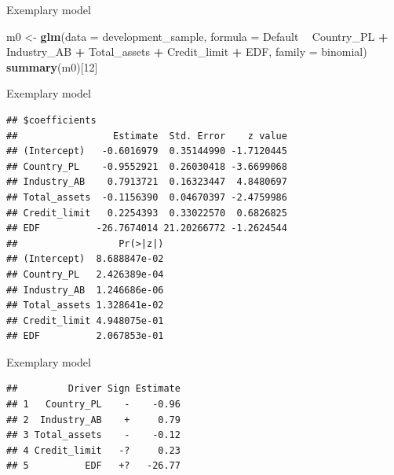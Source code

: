 \documentclass[9pt,ignorenonframetext,]{beamer}
\newenvironment{Shaded}{\begin{snugshade}}{\end{snugshade}}
\newcommand{\KeywordTok}[1]{\textcolor[rgb]{0.13,0.29,0.53}{\textbf{#1}}}
\newcommand{\DataTypeTok}[1]{\textcolor[rgb]{0.13,0.29,0.53}{#1}}
\newcommand{\DecValTok}[1]{\textcolor[rgb]{0.00,0.00,0.81}{#1}}
\newcommand{\StringTok}[1]{\textcolor[rgb]{0.31,0.60,0.02}{#1}}
\newcommand{\OperatorTok}[1]{\textcolor[rgb]{0.81,0.36,0.00}{\textbf{#1}}}
\newcommand{\NormalTok}[1]{#1}
\begin{document}
\begin{frame}[fragile]{Exemplary model}

\begin{Shaded}
\begin{Highlighting}[]
\NormalTok{m0 <-}\StringTok{ }\KeywordTok{glm}\NormalTok{(}\DataTypeTok{data =}\NormalTok{ development_sample,}
          \DataTypeTok{formula =}\NormalTok{ Default }\OperatorTok{~}\StringTok{ }\NormalTok{Country_PL }\OperatorTok{+}\StringTok{ }\NormalTok{Industry_AB }\OperatorTok{+}\StringTok{ }
\StringTok{                               }\NormalTok{Total_assets }\OperatorTok{+}\StringTok{ }\NormalTok{Credit_limit }\OperatorTok{+}\StringTok{ }\NormalTok{EDF,}
         \DataTypeTok{family =}\NormalTok{ binomial)}
\KeywordTok{summary}\NormalTok{(m0)[}\DecValTok{12}\NormalTok{]}
\end{Highlighting}
\end{Shaded}

\end{frame}

\begin{frame}[fragile]{Exemplary model}

\begin{verbatim}
## $coefficients
##                 Estimate  Std. Error    z value
## (Intercept)   -0.6016979  0.35144990 -1.7120445
## Country_PL    -0.9552921  0.26030418 -3.6699068
## Industry_AB    0.7913721  0.16323447  4.8480697
## Total_assets  -0.1156390  0.04670397 -2.4759986
## Credit_limit   0.2254393  0.33022570  0.6826825
## EDF          -26.7674014 21.20266772 -1.2624544
##                  Pr(>|z|)
## (Intercept)  8.688847e-02
## Country_PL   2.426389e-04
## Industry_AB  1.246686e-06
## Total_assets 1.328641e-02
## Credit_limit 4.948075e-01
## EDF          2.067853e-01
\end{verbatim}

\end{frame}

\begin{frame}[fragile]{Exemplary model}

\begin{verbatim}
##         Driver Sign Estimate
## 1   Country_PL    -    -0.96
## 2  Industry_AB    +     0.79
## 3 Total_assets    -    -0.12
## 4 Credit_limit   -?     0.23
## 5          EDF   +?   -26.77
\end{verbatim}

\end{frame}
\end{document}
